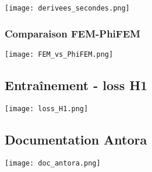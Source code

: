 \begin{minipage}{\linewidth}
	\centering
	\texttt{[image: derivees\_secondes.png]}
\end{minipage}

\subsubsection*{Comparaison FEM-PhiFEM}

\begin{minipage}{\linewidth}
	\centering
	\texttt{[image: FEM\_vs\_PhiFEM.png]}
\end{minipage}

\subsection{Entraînement - loss H1}

\begin{minipage}{\linewidth}
	\centering
	\texttt{[image: loss\_H1.png]}
\end{minipage}

\subsection{Documentation Antora}

\begin{minipage}{\linewidth}
	\centering
	\texttt{[image: doc\_antora.png]}
\end{minipage}

